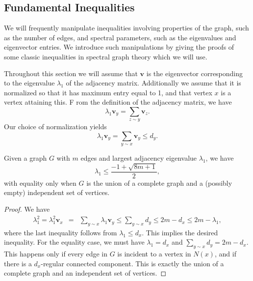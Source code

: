 \subsection{Fundamental Inequalities}

We will frequently manipulate inequalities involving properties of the graph, such as the number
of edges, and spectral parameters, such as the eigenvalues and eigenvector entries.
We introduce such manipulations by giving the proofs of some classic inequalities in spectral graph
theory which we will use.


Throughout this section we will assume that $\mathbf{v}$ is the eigenvector
corresponding to the eigenvalue $\lambda_1$ of the adjacency matrix.  Additionally we assume that
it is normalized so that it has maximum entry equal to 1, and that vertex $x$ is a vertex attaining this.  F
rom the definition of the adjacency matrix, we have
\begin{equation}\label{eigenvector equation}
  \lambda_1 \mathbf{v}_y = \sum_{z \sim y} \mathbf{v}_z .
\end{equation}
Our choice of normalization yields
\begin{equation}
  \lambda_1 \mathbf{v}_y = \sum_{y \sim x} \mathbf{v}_y\leq d_y .
\end{equation}


\begin{theorem}
  Given a graph $G$ with $m$ edges and largest adjacency eigenvalue $\lambda_1$, we have
  \[ \lambda_1 \leq \frac{-1 + \sqrt{8m + 1}}{2} ,\]
  with equality only when $G$ is the union of a complete graph and a (possibly empty) independent set of vertices.
\end{theorem}
\begin{proof}
  We have
  \begin{eqnarray*}
    \lambda_1^2 = \lambda_1^2 \mathbf{v}_x & = & \sum_{y \sim x} \lambda_1 \mathbf{v}_y \leq \sum_{y \sim x} d_y \leq 2m - d_x \leq 2m - \lambda_1, 
  \end{eqnarray*}
  where the last inequality follows from $\lambda_1 \leq d_x$.  This implies the desired inequality.  For the equality case, we must have
  $\lambda_1 = d_x$ and $\sum_{y \sim x} d_y = 2m - d_x$.  This happens only if every edge in $G$ is incident to a vertex in $N(x)$,
  and if there is a $d_x$-regular connected component.  This is exactly the union of a complete graph and an independent set of vertices. 
  
\end{proof}


